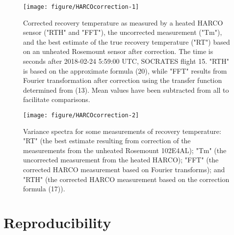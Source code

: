 \documentclass[11pt,twoside,american,12pt,twoside,american]{article}\usepackage[]{graphicx}\usepackage[]{color}
\makeatletter
\def\maxwidth{ %
  \ifdim\Gin@nat@width>\linewidth
    \linewidth
  \else
    \Gin@nat@width
  \fi
}
\newenvironment{knitrout}{}{} %
\let\stdsection\section
\renewcommand{\section}{\newpage\stdsection}
\makeatother
\begin{document}
\begin{knitrout}
\color{fgcolor}\begin{figure}

{\centering \texttt{[image: figure/HARCOcorrection-1]} 

}

\caption[Corrected recovery temperature as measured by a heated HARCO sensor ("RTH" and "FFT"), the uncorrected measurement ("Tm"), and the best estimate of the true recovery temperature ("RT") based on an unheated Rosemount sensor after correction]{Corrected recovery temperature as measured by a heated HARCO sensor ("RTH" and "FFT"), the uncorrected measurement ("Tm"), and the best estimate of the true recovery temperature ("RT") based on an unheated Rosemount sensor after correction. The time is seconds after 2018-02-24 5:59:00 UTC, SOCRATES flight 15. "RTH" is based on the approximate formula (20), while "FFT" results from Fourier transformation after correction using the transfer function determined from (13). Mean values have been subtracted from all to facilitate comparisons.}\label{fig:HARCOcorrection1}
\end{figure}

\begin{figure}

{\centering \texttt{[image: figure/HARCOcorrection-2]} 

}

\caption[Variance spectra for some measurements of recovery temperature]{Variance spectra for some measurements of recovery temperature: "RT" (the best estimate resulting from correction of the measurements from the unheated Rosemount 102E4AL); "Tm" (the uncorrected measurement from the heated HARCO); "FFT" (the corrected HARCO measurement based on Fourier transforms); and "RTH" (the corrected HARCO measurement based on the correction formula (17)).}\label{fig:HARCOcorrection2}
\end{figure}


\end{knitrout}

\clearpage{}

\section{Reproducibility}
\end{document}
